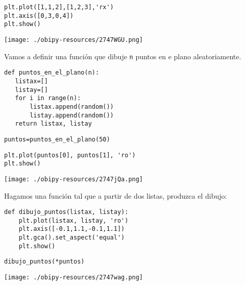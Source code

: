 \documentclass[11pt]{article}
\begin{document}
\lstset{language=ipython,label= ,caption= ,captionpos=b,numbers=none}
\begin{lstlisting}
plt.plot([1,1,2],[1,2,3],'rx')
plt.axis([0,3,0,4])
plt.show()
\end{lstlisting}

\begin{center}
\texttt{[image: ./obipy-resources/2747WGU.png]}
\end{center}

Vamos a definir una función que dibuje \texttt{n} puntos en e plano aleatoriamente.

\lstset{language=ipython,label= ,caption= ,captionpos=b,numbers=none}
\begin{lstlisting}
def puntos_en_el_plano(n):
   listax=[]
   listay=[]
   for i in range(n):
       listax.append(random())
       listay.append(random())
   return listax, listay
\end{lstlisting}

\lstset{language=ipython,label= ,caption= ,captionpos=b,numbers=none}
\begin{lstlisting}
puntos=puntos_en_el_plano(50)
\end{lstlisting}

\lstset{language=ipython,label= ,caption= ,captionpos=b,numbers=none}
\begin{lstlisting}
plt.plot(puntos[0], puntos[1], 'ro')
plt.show()
\end{lstlisting}

\begin{center}
\texttt{[image: ./obipy-resources/2747jQa.png]}
\end{center}

Hagamos una función tal que a partir de dos listas, produzca el dibujo:

\lstset{language=ipython,label= ,caption= ,captionpos=b,numbers=none}
\begin{lstlisting}
def dibujo_puntos(listax, listay):
    plt.plot(listax, listay, 'ro')
    plt.axis([-0.1,1.1,-0.1,1.1])
    plt.gca().set_aspect('equal')
    plt.show()
\end{lstlisting}

\lstset{language=ipython,label= ,caption= ,captionpos=b,numbers=none}
\begin{lstlisting}
dibujo_puntos(*puntos)
\end{lstlisting}

\begin{center}
\texttt{[image: ./obipy-resources/2747wag.png]}
\end{center}
\end{document}
